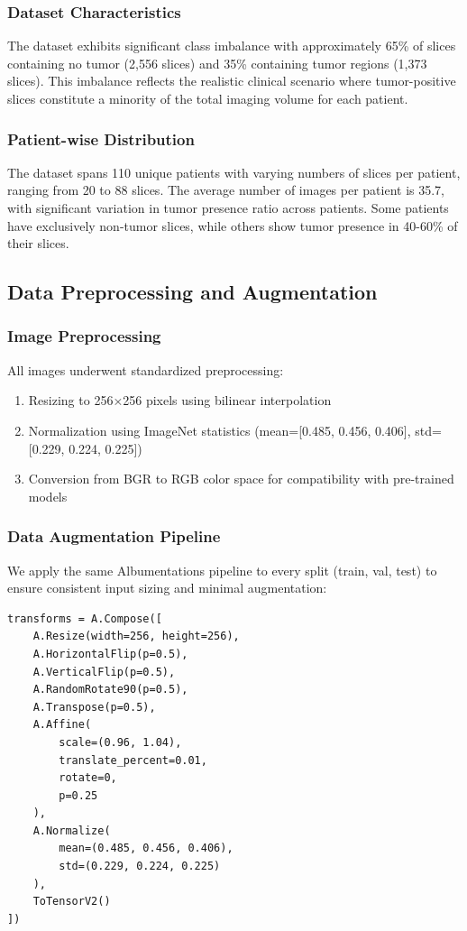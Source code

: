 \documentclass[a4paper, journal]{IEEEtran}
\begin{document}
\subsubsection{Dataset Characteristics}
The dataset exhibits significant class imbalance with approximately 65\% of slices containing no tumor (2,556 slices) and 35\% containing tumor regions (1,373 slices). This imbalance reflects the realistic clinical scenario where tumor-positive slices constitute a minority of the total imaging volume for each patient.

\subsubsection{Patient-wise Distribution}
The dataset spans 110 unique patients with varying numbers of slices per patient, ranging from 20 to 88 slices. The average number of images per patient is 35.7, with significant variation in tumor presence ratio across patients. Some patients have exclusively non-tumor slices, while others show tumor presence in 40-60\% of their slices.

\subsection{Data Preprocessing and Augmentation}

\subsubsection{Image Preprocessing}
All images underwent standardized preprocessing:
\begin{enumerate}
    \item Resizing to 256×256 pixels using bilinear interpolation
    \item Normalization using ImageNet statistics (mean=[0.485, 0.456, 0.406], std=[0.229, 0.224, 0.225])
    \item Conversion from BGR to RGB color space for compatibility with pre-trained models
\end{enumerate}

\subsubsection{Data Augmentation Pipeline}
We apply the same Albumentations pipeline to every split (train, val, test) to ensure consistent input sizing and minimal augmentation:

\begin{lstlisting}[caption={Albumentations augmentation pipeline}]
transforms = A.Compose([
    A.Resize(width=256, height=256),
    A.HorizontalFlip(p=0.5),
    A.VerticalFlip(p=0.5),
    A.RandomRotate90(p=0.5),
    A.Transpose(p=0.5),
    A.Affine(
        scale=(0.96, 1.04),
        translate_percent=0.01,
        rotate=0,
        p=0.25
    ),
    A.Normalize(
        mean=(0.485, 0.456, 0.406),
        std=(0.229, 0.224, 0.225)
    ),
    ToTensorV2()
])
\end{lstlisting}
\end{document}
